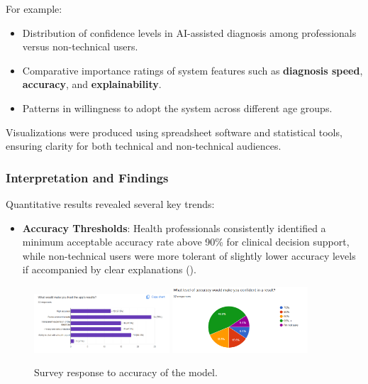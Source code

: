 \documentclass[
  12pt,
  oneside]{article}
\providecommand{\tightlist}{%
  \setlength{\itemsep}{0pt}\setlength{\parskip}{0pt}}
\begin{document}
For example:

\begin{itemize}
\tightlist
\item
  Distribution of confidence levels in AI-assisted diagnosis among
  professionals versus non-technical users.
\item
  Comparative importance ratings of system features such as
  \textbf{diagnosis speed}, \textbf{accuracy}, and
  \textbf{explainability}.
\item
  Patterns in willingness to adopt the system across different age
  groups.
\end{itemize}

Visualizations were produced using spreadsheet software and statistical
tools, ensuring clarity for both technical and non-technical audiences.

\subsubsection{Interpretation and
Findings}\label{interpretation-and-findings}

Quantitative results revealed several key trends:

\begin{itemize}
\tightlist
\item
  \textbf{Accuracy Thresholds}: Health professionals consistently
  identified a minimum acceptable accuracy rate above 90\% for clinical
  decision support, while non-technical users were more tolerant of
  slightly lower accuracy levels if accompanied by clear explanations
  ().
\end{itemize}

\begin{figure}[h!]
    \centering
    \includegraphics[width=0.45\textwidth]{accuracy1.png}
    \hfill
    \includegraphics[width=0.45\textwidth]{accuracy2.png}
    \caption{Survey response to accuracy of the model.}
\end{figure}
\end{document}
